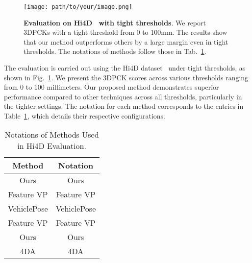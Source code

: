 \documentclass{article}
\begin{document}
\begin{figure}[h]
    \centering
    \texttt{[image: path/to/your/image.png]} %
    \caption{\textbf{Evaluation on Hi4D~\cite{hi4d} with tight thresholds}. We report 3DPCKs with a tight threshold from 0 to 100mm. The results show that our method outperforms others by a large margin even in tight thresholds. The notations of methods follow those in Tab.~\ref{tab:hi4d_eval}.}
    \label{fig:hi4d_tight_thresholds}
\end{figure}

The evaluation is carried out using the Hi4D dataset~\cite{hi4d} under tight thresholds, as shown in Fig.~\ref{fig:hi4d_tight_thresholds}. We present the 3DPCK scores across various thresholds ranging from 0 to 100 millimeters. Our proposed method demonstrates superior performance compared to other techniques across all thresholds, particularly in the tighter settings. The notation for each method corresponds to the entries in Table~\ref{tab:hi4d_eval}, which details their respective configurations.

\begin{table}[h]
    \centering
    \begin{tabular}{c c}
        \hline
        Method & Notation \\
        \hline
        Ours & Ours \\
        \hline
        Feature VP & Feature VP \\
        \hline
        VehiclePose & VehiclePose \\
        \hline
        Feature VP & Feature VP \\
        \hline
        Ours & Ours \\
        \hline
        4DA & 4DA \\
        \hline
    \end{tabular}
    \caption{Notations of Methods Used in Hi4D Evaluation.}
    \label{tab:hi4d_eval}
\end{table}
\end{document}
